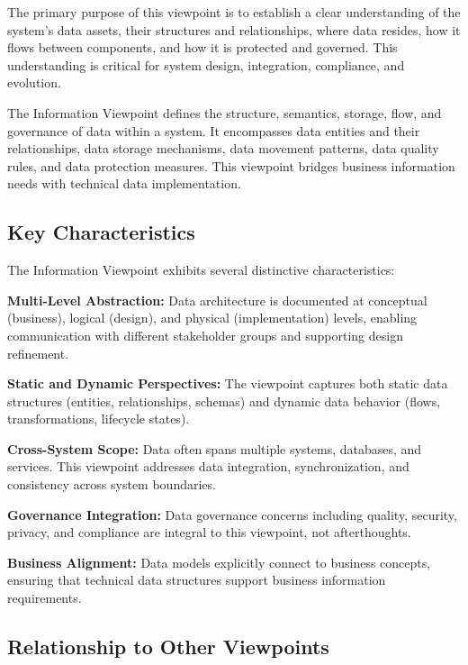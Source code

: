 \documentclass[11pt,letterpaper]{article}
\begin{document}
The primary purpose of this viewpoint is to establish a clear understanding of the system's data assets, their structures and relationships, where data resides, how it flows between components, and how it is protected and governed. This understanding is critical for system design, integration, compliance, and evolution.

\begin{definitionbox}
The Information Viewpoint defines the structure, semantics, storage, flow, and governance of data within a system. It encompasses data entities and their relationships, data storage mechanisms, data movement patterns, data quality rules, and data protection measures. This viewpoint bridges business information needs with technical data implementation.
\end{definitionbox}

\subsection{Key Characteristics}

The Information Viewpoint exhibits several distinctive characteristics:

\textbf{Multi-Level Abstraction:} Data architecture is documented at conceptual (business), logical (design), and physical (implementation) levels, enabling communication with different stakeholder groups and supporting design refinement.

\textbf{Static and Dynamic Perspectives:} The viewpoint captures both static data structures (entities, relationships, schemas) and dynamic data behavior (flows, transformations, lifecycle states).

\textbf{Cross-System Scope:} Data often spans multiple systems, databases, and services. This viewpoint addresses data integration, synchronization, and consistency across system boundaries.

\textbf{Governance Integration:} Data governance concerns including quality, security, privacy, and compliance are integral to this viewpoint, not afterthoughts.

\textbf{Business Alignment:} Data models explicitly connect to business concepts, ensuring that technical data structures support business information requirements.

\subsection{Relationship to Other Viewpoints}
\end{document}
